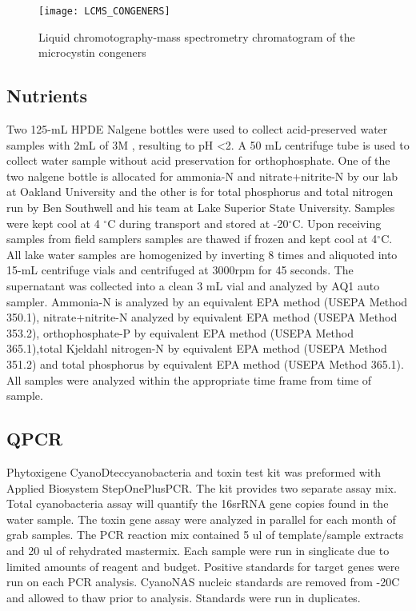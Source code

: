 \begin{figure}[h]
  \texttt{[image: LCMS\_CONGENERS]}
  \caption{Liquid chromotography-mass spectrometry chromatogram of the microcystin congeners}
  \label{spectra}
\end{figure}

\subsection{Nutrients}


Two 125-mL HPDE Nalgene bottles were used to collect acid-preserved water samples with 2mL of 3M , resulting to pH \textless 2. A 50 mL centrifuge tube is used to collect water sample without acid preservation for orthophosphate. One of the two nalgene bottle is allocated for ammonia-N and nitrate+nitrite-N by our lab at Oakland University and the other is for total phosphorus and total nitrogen run by Ben Southwell and his team at Lake Superior State University.  Samples were kept cool at 4 $^\circ$C during transport and stored at -20$^\circ$C. Upon receiving samples from field samplers samples are thawed if frozen and kept cool at 4$^\circ$C. All lake water samples are homogenized by inverting 8 times and aliquoted into 15-mL centrifuge vials and centrifuged at 3000rpm for 45 seconds. The supernatant was collected into a clean 3 mL vial and analyzed by AQ1 auto sampler. Ammonia-N is analyzed by an equivalent EPA method (USEPA Method 350.1), nitrate+nitrite-N analyzed by equivalent EPA method (USEPA Method 353.2), orthophosphate-P by equivalent EPA method (USEPA Method 365.1),total Kjeldahl nitrogen-N by equivalent EPA method (USEPA Method 351.2) and total phosphorus by equivalent EPA method (USEPA Method 365.1). All samples were analyzed within the appropriate time frame from time of sample.

\subsection{QPCR}

Phytoxigene CyanoDtec\texttrademark cyanobacteria and toxin test kit was preformed with Applied Biosystem StepOnePlus\texttrademark PCR. The kit provides two separate assay mix. Total cyanobacteria assay will quantify the 16srRNA gene copies found in the water sample. The toxin gene assay  were analyzed in parallel for each month of grab samples.  The PCR reaction mix contained 5 ul of template/sample extracts and 20 ul of rehydrated mastermix.  Each sample were run in singlicate due to limited amounts of reagent and budget. Positive standards for target genes  were run on each PCR analysis. CyanoNAS nucleic standards are removed from -20C and allowed to thaw prior to analysis.  Standards were run in duplicates.

